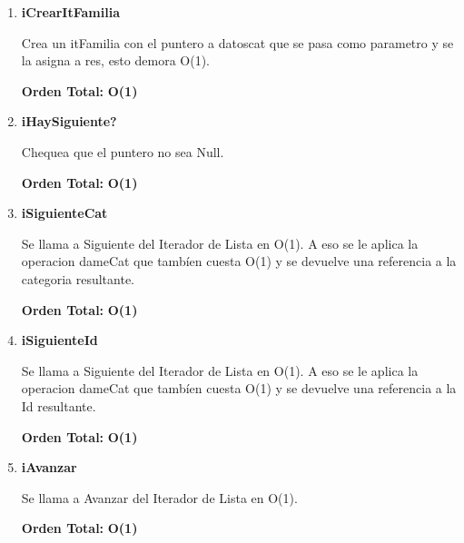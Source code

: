 \vspace*{1em}
\begin{enumerate}

\item\textbf{iCrearItFamilia}
\par Crea un itFamilia con el puntero a datoscat que se pasa como parametro y se la asigna a res, esto demora O(1).
\par \textbf{Orden Total:} \textbf{O(1)}

\item\textbf{iHaySiguiente?}
\par Chequea que el puntero no sea Null.
\par \textbf{Orden Total:} \textbf{O(1)}

\item\textbf{iSiguienteCat}
\par Se llama a Siguiente del Iterador de Lista en O(1). A eso se le aplica la operacion dameCat que tambíen cuesta O(1) y se devuelve una referencia a la categoria resultante.
\par \textbf{Orden Total:} \textbf{O(1)}

\item\textbf{iSiguienteId}
\par Se llama a Siguiente del Iterador de Lista en O(1). A eso se le aplica la operacion dameCat que tambíen cuesta O(1) y se devuelve una referencia a la Id resultante.
\par \textbf{Orden Total:} \textbf{O(1)}

\item\textbf{iAvanzar}
\par Se llama a Avanzar del Iterador de Lista en O(1).
\par \textbf{Orden Total:} \textbf{O(1)}

\end{enumerate}




